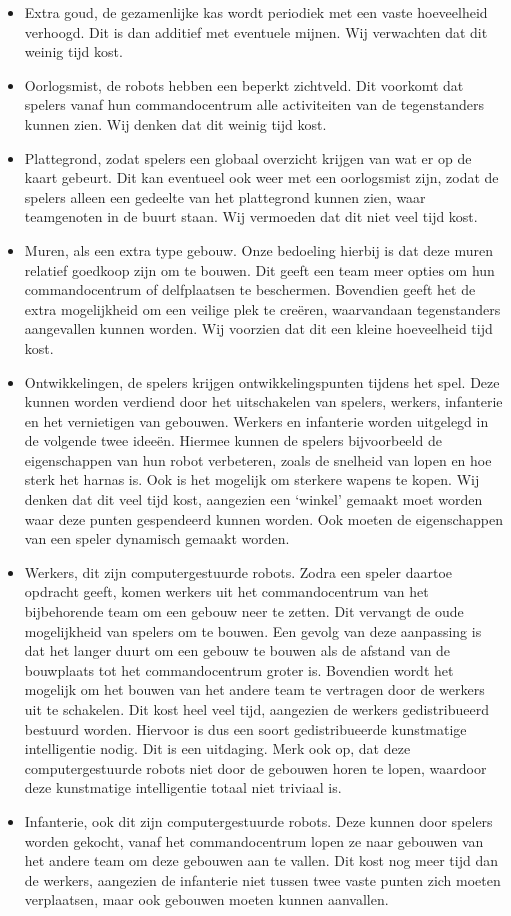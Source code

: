 \begin{itemize}
  \item Extra goud, de gezamenlijke kas wordt periodiek met een vaste hoeveelheid verhoogd. Dit is dan additief met eventuele mijnen. Wij verwachten dat dit weinig tijd kost.
  \item Oorlogsmist, de robots hebben een beperkt zichtveld. Dit voorkomt dat spelers vanaf hun commandocentrum alle activiteiten van de tegenstanders kunnen zien. Wij denken dat dit weinig tijd kost.
  \item Plattegrond, zodat spelers een globaal overzicht krijgen van wat er op de kaart gebeurt. Dit kan eventueel ook weer met een oorlogsmist zijn, zodat de spelers alleen een gedeelte van het plattegrond kunnen zien, waar teamgenoten in de buurt staan. Wij vermoeden dat dit niet veel tijd kost.
  \item Muren, als een extra type gebouw. Onze bedoeling hierbij is dat deze muren relatief goedkoop zijn om te bouwen. Dit geeft een team meer opties om hun commandocentrum of delfplaatsen te beschermen. Bovendien geeft het de extra mogelijkheid om een veilige plek te cre\"eren, waarvandaan tegenstanders aangevallen kunnen worden. Wij voorzien dat dit een kleine hoeveelheid tijd kost.
  \item Ontwikkelingen, de spelers krijgen ontwikkelingspunten tijdens het spel. Deze kunnen worden verdiend door het uitschakelen van spelers, werkers, infanterie en het vernietigen van gebouwen. Werkers en infanterie worden uitgelegd in de volgende twee idee\"en. Hiermee kunnen de spelers bijvoorbeeld de eigenschappen van hun robot verbeteren, zoals de snelheid van lopen en hoe sterk het harnas is. Ook is het mogelijk om sterkere wapens te kopen. Wij denken dat dit veel tijd kost, aangezien een `winkel' gemaakt moet worden waar deze punten gespendeerd kunnen worden. Ook moeten de eigenschappen van een speler dynamisch gemaakt worden.
  \item Werkers, dit zijn computergestuurde robots. Zodra een speler daartoe opdracht geeft, komen werkers uit het commandocentrum van het bijbehorende team om een gebouw neer te zetten. Dit vervangt de oude mogelijkheid van spelers om te bouwen. Een gevolg van deze aanpassing is dat het langer duurt om een gebouw te bouwen als de afstand van de bouwplaats tot het commandocentrum groter is. Bovendien wordt het mogelijk om het bouwen van het andere team te vertragen door de werkers uit te schakelen. Dit kost heel veel tijd, aangezien de werkers gedistribueerd bestuurd worden. Hiervoor is dus een soort gedistribueerde kunstmatige intelligentie nodig. Dit is een uitdaging. Merk ook op, dat deze computergestuurde robots niet door de gebouwen horen te lopen, waardoor deze kunstmatige intelligentie totaal niet triviaal is.
  \item Infanterie, ook dit zijn computergestuurde robots. Deze kunnen door spelers worden gekocht, vanaf het commandocentrum lopen ze naar gebouwen van het andere team om deze gebouwen aan te vallen. Dit kost nog meer tijd dan de werkers, aangezien de infanterie niet tussen twee vaste punten zich moeten verplaatsen, maar ook gebouwen moeten kunnen aanvallen.
\end{itemize} 